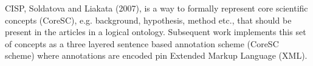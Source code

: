 CISP, Soldatova and Liakata (2007), is a way to formally represent core
scientific concepts (CoreSC), e.g. background, hypothesis, method etc., that
should be present in the articles in a logical
ontology\cite{soldatova2007ontology}. Subsequent work implements this set of
concepts as a three layered sentence based annotation scheme (CoreSC scheme)
where annotations are encoded pin Extended Markup Language
(XML)\cite{LIAKATA10.644}.



